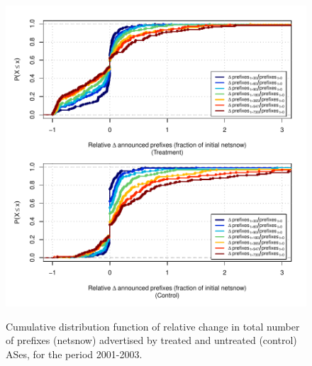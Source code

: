 \clearpage
\vspace*{16pt}
\begin{figure}[H]
\begin{centering}
\begin{singlespace}
\captionsetup{list=no}
    \includegraphics[width=6in]{figures/behavior-rel_netsnow-2001_2003-corr.pdf}
    \vspace{-2em}\\
    \caption{Cumulative distribution function of relative change in total
    number of prefixes (netsnow) advertised by treated and untreated (control)
    ASes, for the period 2001-2003.}
\end{singlespace}
\end{centering}
\end{figure}

